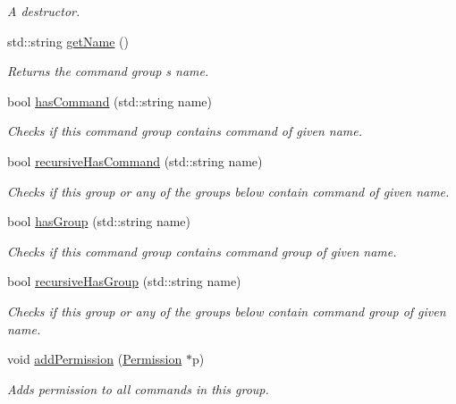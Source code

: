 \begin{DoxyCompactItemize}
\begin{DoxyCompactList}\small\item\em A destructor. \end{DoxyCompactList}\item 
std\+::string \hyperlink{class_r_c_f_1_1_server_1_1_command_group_ac20669db94033c31e1e73044c50807e0}{get\+Name} ()
\begin{DoxyCompactList}\small\item\em Returns the command group\textquotesingle{} s name. \end{DoxyCompactList}\item 
bool \hyperlink{class_r_c_f_1_1_server_1_1_command_group_acf4e447d19f9538b5daa773733393780}{has\+Command} (std\+::string name)
\begin{DoxyCompactList}\small\item\em Checks if this command group contains command of given name. \end{DoxyCompactList}\item 
bool \hyperlink{class_r_c_f_1_1_server_1_1_command_group_a8bcba675553c37e509abc48722fa49d7}{recursive\+Has\+Command} (std\+::string name)
\begin{DoxyCompactList}\small\item\em Checks if this group or any of the groups below contain command of given name. \end{DoxyCompactList}\item 
bool \hyperlink{class_r_c_f_1_1_server_1_1_command_group_a17c152ab87a6486cbde8df0bf800ea26}{has\+Group} (std\+::string name)
\begin{DoxyCompactList}\small\item\em Checks if this command group contains command group of given name. \end{DoxyCompactList}\item 
bool \hyperlink{class_r_c_f_1_1_server_1_1_command_group_ae470224e829e141924eaa15d3eecc106}{recursive\+Has\+Group} (std\+::string name)
\begin{DoxyCompactList}\small\item\em Checks if this group or any of the groups below contain command group of given name. \end{DoxyCompactList}\item 
void \hyperlink{class_r_c_f_1_1_server_1_1_command_group_a7effd25d875e2f58673d1675821419e7}{add\+Permission} (\hyperlink{class_r_c_f_1_1_server_1_1_permission}{Permission} $\ast$p)
\begin{DoxyCompactList}\small\item\em Adds permission to all commands in this group. \end{DoxyCompactList}\item 

\end{DoxyCompactItemize}
